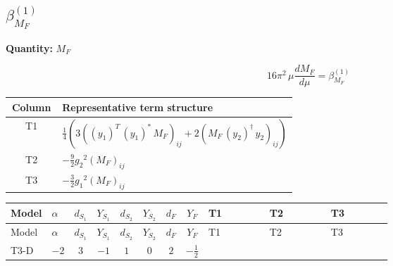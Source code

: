 \documentclass[8pt]{article}
\begin{document}
\begin{landscape}
\section*{$\beta_{M_F}^{(1)}$}
\noindent\textbf{Quantity: }$M_F$\par\smallskip
\[16\pi^2\,\mu\frac{d M_F}{d\mu}=\beta_{M_F}^{(1)}\]
\begin{center}
\begin{tabular}{@{}c >{\raggedright\arraybackslash}p{0.82\linewidth}@{}}
\toprule
Column & Representative term structure \\
\midrule
T1 & \(\displaystyle \frac{1}{4} (3 \left(\left({y_1}\right)^{T}\,\left({y_1}\right)^{*}\,{M_F}\right)_{ij}+2 \left({M_F}\,\left({y_2}\right)^{\dagger}\,{y_2}\right)_{ij})\) \\
\midrule
T2 & \(\displaystyle -\frac{9}{2} {g_2}^2 \left({M_F}\right)_{ij}\) \\
\midrule
T3 & \(\displaystyle -\frac{3}{2} {g_1}^2 \left({M_F}\right)_{ij}\) \\
\midrule
\bottomrule
\end{tabular}
\end{center}
\smallskip
\tiny
\begin{longtable}{@{}llcccccc >{\raggedright\arraybackslash}p{0.21\linewidth} >{\raggedright\arraybackslash}p{0.21\linewidth} >{\raggedright\arraybackslash}p{0.21\linewidth}@{}}
\toprule
Model & $\alpha$ & $d_{S_1}$ & $Y_{S_1}$ & $d_{S_2}$ & $Y_{S_2}$ & $d_F$ & $Y_F$ & T1 & T2 & T3 \\
\midrule
\endfirsthead
\toprule
Model & $\alpha$ & $d_{S_1}$ & $Y_{S_1}$ & $d_{S_2}$ & $Y_{S_2}$ & $d_F$ & $Y_F$ & T1 & T2 & T3 \\
\midrule
\endhead
T3-D & $-2$ & $3$ & $-1$ & $1$ & $0$ & $2$ & $-\frac{1}{2}$ & \scriptsize\adjustbox{max width=\linewidth}{$\begin{gathered} \frac{1}{4} (3 \left(\left({y_1}\right)^{T}\,\left({y_1}\right)^{*}\,{M_F}\right)_{ij}+2 \left({M_F}\,\left({y_2}\right)^{\dagger}\,{y_2}\right)_{ij})\end{gathered}$} & \scriptsize\adjustbox{max width=\linewidth}{$\begin{gathered} -\frac{9}{2} {g_2}^2 \left({M_F}\right)_{ij}\end{gathered}$} & \scriptsize\adjustbox{max width=\linewidth}{$\begin{gathered} -\frac{3}{2} {g_1}^2 \left({M_F}\right)_{ij}\end{gathered}$} \\
\midrule
\bottomrule
\end{longtable}
\clearpage

\end{landscape}
\end{document}
